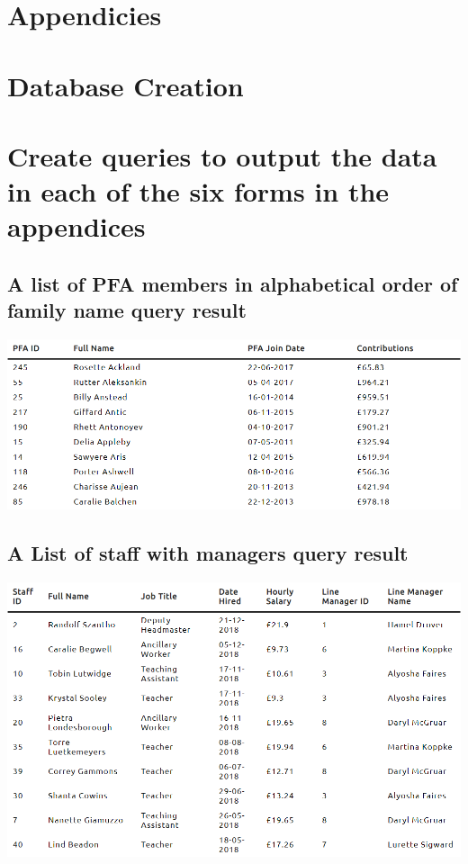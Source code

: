 \documentclass{article}
\begin{document}
\newpage

\section{Appendicies}
\appendix

\section{Database Creation}


\section{Create queries to output the data in each of the six forms in the appendices}
\subsection{A list of PFA members in alphabetical order of family name query result}
\includegraphics[width=\linewidth]{images/01.png}
\subsection{A List of staff with managers query result}
\includegraphics[width=\linewidth]{images/02.png}
\end{document}
